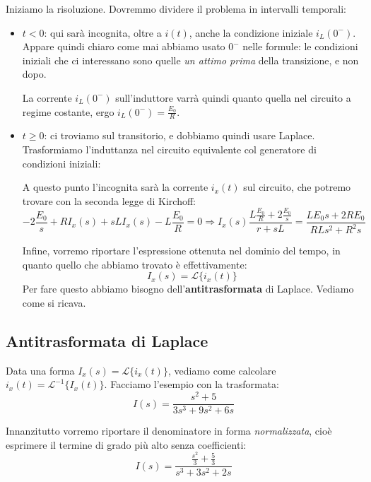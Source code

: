 \documentclass[a4paper,11pt]{article}
\begin{document}
Iniziamo la risoluzione.
Dovremmo dividere il problema in intervalli temporali:
\begin{itemize}
	\item $t < 0$: qui sarà incognita, oltre a $i(t)$, anche la condizione iniziale $i_L(0^-)$.
		Appare quindi chiaro come mai abbiamo usato $0^-$ nelle formule: le condizioni iniziali che ci interessano sono quelle \textit{un attimo prima} della transizione, e non dopo.

		La corrente $i_L(0^-)$ sull'induttore varrà quindi quanto quella nel circuito a regime costante, ergo $i_L(0^-) = \frac{E_0}{R}$.
	\item $t \geq 0$: ci troviamo sul transitorio, e dobbiamo quindi usare Laplace.
		Trasformiamo l'induttanza nel circuito equivalente col generatore di condizioni iniziali:

\begin{center}
\end{center}

A questo punto l'incognita sarà la corrente $i_x(t)$ sul circuito, che potremo trovare con la seconda legge di Kirchoff:
$$
-2 \frac{E_0}{s} + R I_x(s) + s L I_x(s) - L \frac{E_0}{R} = 0 \Rightarrow I_x(s) \frac{L \frac{E_0}{R} + 2 \frac{E_0}{s}}{r + s L} = \frac{L E_0 s + 2 R E_0}{R L s^2 + R^2 s}
$$

Infine, vorremo riportare l'espressione ottenuta nel dominio del tempo, in quanto quello che abbiamo trovato è effettivamente:
$$I_x(s) = \mathcal{L}\{ i_x(t) \}$$
Per fare questo abbiamo bisogno dell'\textbf{antitrasformata} di Laplace.
Vediamo come si ricava.
\end{itemize}

\subsection{Antitrasformata di Laplace}
Data una forma $I_x(s) = \mathcal{L}\{ i_x(t) \}$, vediamo come calcolare $ i_x(t) = \mathcal{L}^{-1} \{ I_x(t) \}$.
Facciamo l'esempio con la trasformata:
$$
I(s) = \frac{s^2 + 5}{3s^3 + 9s^2 + 6s}
$$

Innanzitutto vorremo riportare il denominatore in forma \textit{normalizzata}, cioè esprimere il termine di grado più alto senza coefficienti:
$$
I(s) = \frac{\frac{s^2}{3} + \frac{5}{3}}{s^3 + 3s^2 + 2s}
$$
\end{document}
